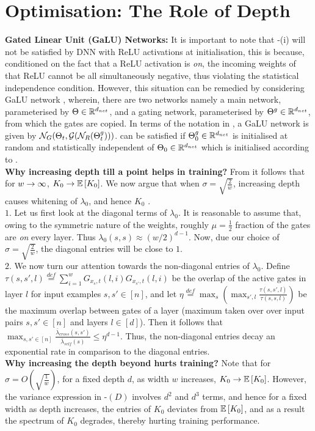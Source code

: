 \section{Optimisation: The Role of Depth}\label{sec:optimisation}
\textbf{Gated Linear Unit (GaLU) Networks:} It is important to note that -(i) will not be satisfied by DNN with ReLU activations at initialisation, this is because, conditioned on the fact that a ReLU activation is \emph{on}, the incoming weights of that ReLU cannot be all simultaneously negative, thus violating the statistical independence condition. However, this situation can be remedied by considering GaLU network \cite{}, wherein, there are two networks namely a main network, parameterised by $\Theta\in \mathbb{R}^{d_{net}}$, and a gating network, parameterised by ${\Theta}^g\in\mathbb{R}^{d_{net}}$, from which the gates are copied. In terms of the notation in , a GaLU network is given by $\mathcal{N}_G(\Theta_t,\mathcal{G}(\mathcal{N}_R({\Theta}^g_t)))$.
  can be satisfied if ${\Theta}^g_0\in \mathbb{R}^{d_{net}}$ is initialised at random and statistically independent of $\Theta_0\in \mathbb{R}^{d_{net}}$ which is initialised according to .\hfill\\
\textbf{Why increasing depth till a point helps in training? }From  it follows that for $w\rightarrow\infty$, $K_0\rightarrow\mathbb{E}\left[K_0\right]$. We now argue that when $\sigma=\sqrt{\frac{2}{w}}$, increasing depth causes whitening of $\lambda_0$, and hence $K_0$ .\hfill\\
$1.$ Let us first look at the diagonal terms of $\lambda_0$. It is reasonable to assume that, owing to the symmetric nature of the weights, roughly $\mu=\frac{1}{2}$ fraction of the gates are \emph{on} every layer. Thus $\lambda_0(s,s)\approx (w/2)^{d-1}$. Now, due our choice of $\sigma=\sqrt{\frac{2}{w}}$, the diagonal entries will be close to $1$.\hfill\\
$2.$ We now turn our attention towards the non-diagonal entries of $\lambda_0$. Define $\tau(s,s',l)\stackrel{def}=\sum_{i=1}^w G_{x_s,t}(l,i)G_{x_{s'},t}(l,i)$ be the overlap of the active gates in layer $l$ for input examples $s,s'\in[n]$, and  let $\eta\stackrel{def}=\max_s\left(\max_{s',l} \frac{\tau(s,s',l)}{\tau(s,s,l)}\right)$ be the maximum overlap between gates of a layer (maximum taken over over input pairs $s,s'\in[n]$ and layers $l\in [d]$).  Then it follows that $\max_{s,s'\in [n]} \frac{\bar{\lambda}_{cross}(s,s')}{\bar{\lambda}_{self}(s)}\leq \eta^{d-1}$. Thus, the non-diagonal entries decay an exponential rate in comparison to the diagonal entries.\hfill\\
\textbf{Why increasing the depth beyond hurts training?} Note that for $\sigma=O\left(\sqrt{\frac{1}{w}}\right)$, for a fixed depth $d$, as width $w$ increases, $K_0\rightarrow\mathbb{E}\left[K_0\right]$. However, the variance expression in -$(D)$ involves $d^2$ and $d^3$ terms, and hence for a fixed width as depth increases, the entries of $K_0$ deviates from $\mathbb{E}\left[K_0\right]$, and as a result the spectrum of $K_0$ degrades, thereby hurting training performance.
